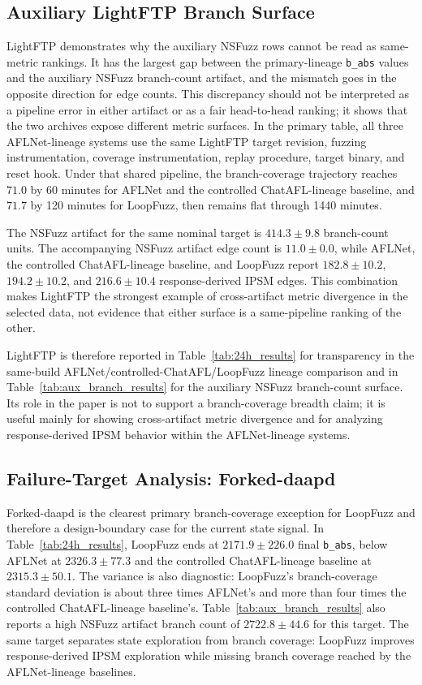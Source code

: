 \documentclass[final,5p,times,number]{elsarticle}
\begin{document}
\subsection{Auxiliary LightFTP Branch Surface}
\label{sec:lightftp_anomaly}

LightFTP demonstrates why the auxiliary NSFuzz rows cannot be read as same-metric rankings. It has the largest gap between the primary-lineage \texttt{b\_abs} values and the auxiliary NSFuzz branch-count artifact, and the mismatch goes in the opposite direction for edge counts. This discrepancy should not be interpreted as a pipeline error in either artifact or as a fair head-to-head ranking; it shows that the two archives expose different metric surfaces. In the primary table, all three AFLNet-lineage systems use the same LightFTP target revision, fuzzing instrumentation, coverage instrumentation, replay procedure, target binary, and reset hook. Under that shared pipeline, the branch-coverage trajectory reaches $71.0$ by 60 minutes for AFLNet and the controlled ChatAFL-lineage baseline, and $71.7$ by 120 minutes for LoopFuzz, then remains flat through 1440 minutes.

The NSFuzz artifact for the same nominal target is $414.3{\pm}9.8$ branch-count units. The accompanying NSFuzz artifact edge count is $11.0{\pm}0.0$, while AFLNet, the controlled ChatAFL-lineage baseline, and LoopFuzz report $182.8{\pm}10.2$, $194.2{\pm}10.2$, and $216.6{\pm}10.4$ response-derived IPSM edges. This combination makes LightFTP the strongest example of cross-artifact metric divergence in the selected data, not evidence that either surface is a same-pipeline ranking of the other.

LightFTP is therefore reported in Table~\ref{tab:24h_results} for transparency in the same-build AFLNet/controlled-ChatAFL/LoopFuzz lineage comparison and in Table~\ref{tab:aux_branch_results} for the auxiliary NSFuzz branch-count surface. Its role in the paper is not to support a branch-coverage breadth claim; it is useful mainly for showing cross-artifact metric divergence and for analyzing response-derived IPSM behavior within the AFLNet-lineage systems.

\subsection{Failure-Target Analysis: Forked-daapd}
\label{sec:forked_failure}

Forked-daapd is the clearest primary branch-coverage exception for LoopFuzz and therefore a design-boundary case for the current state signal. In Table~\ref{tab:24h_results}, LoopFuzz ends at $2171.9{\pm}226.0$ final \texttt{b\_abs}, below AFLNet at $2326.3{\pm}77.3$ and the controlled ChatAFL-lineage baseline at $2315.3{\pm}50.1$. The variance is also diagnostic: LoopFuzz's branch-coverage standard deviation is about three times AFLNet's and more than four times the controlled ChatAFL-lineage baseline's. Table~\ref{tab:aux_branch_results} also reports a high NSFuzz artifact branch count of $2722.8{\pm}44.6$ for this target. The same target separates state exploration from branch coverage: LoopFuzz improves response-derived IPSM exploration while missing branch coverage reached by the AFLNet-lineage baselines.
\end{document}
